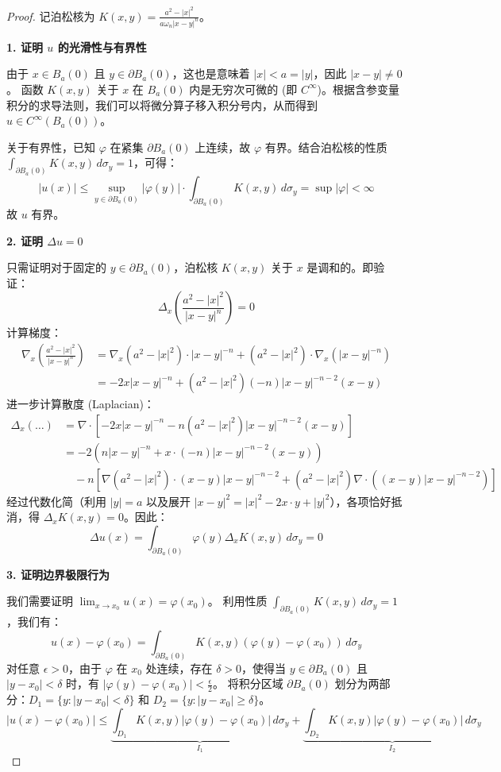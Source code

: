 \documentclass[12pt,a4paper]{ctexart}
\begin{document}
	\begin{proof}
		记泊松核为 $K(x, y) = \frac{a^2 - |x|^2}{a \omega_n |x-y|^n}$。
		
		\textbf{1. 证明 $u$ 的光滑性与有界性}
		
		由于 $x \in B_a(0)$ 且 $y \in \partial B_a(0)$，这也是意味着 $|x| < a = |y|$，因此 $|x-y| \neq 0$。
		函数 $K(x, y)$ 关于 $x$ 在 $B_a(0)$ 内是无穷次可微的 (即 $C^\infty$)。根据含参变量积分的求导法则，我们可以将微分算子移入积分号内，从而得到 $u \in C^\infty(B_a(0))$。
		
		关于有界性，已知 $\varphi$ 在紧集 $\partial B_a(0)$ 上连续，故 $\varphi$ 有界。结合泊松核的性质 $\int_{\partial B_a(0)} K(x, y) \, d\sigma_y = 1$，可得：
		\[
		|u(x)| \le \sup_{y \in \partial B_a(0)} |\varphi(y)| \cdot \int_{\partial B_a(0)} K(x, y) \, d\sigma_y = \sup |\varphi| < \infty
		\]
		故 $u$ 有界。
		
		\vspace{1em}
		
		\textbf{2. 证明 $\Delta u = 0$}
		
		只需证明对于固定的 $y \in \partial B_a(0)$，泊松核 $K(x, y)$ 关于 $x$ 是调和的。即验证：
		\[
		\Delta_x \left( \frac{a^2 - |x|^2}{|x-y|^n} \right) = 0
		\]
		计算梯度：
		\begin{align*}
			\nabla_x \left( \frac{a^2 - |x|^2}{|x-y|^n} \right) &= \nabla_x (a^2 - |x|^2) \cdot |x-y|^{-n} + (a^2 - |x|^2) \cdot \nabla_x (|x-y|^{-n}) \\
			&= -2x |x-y|^{-n} + (a^2 - |x|^2) (-n) |x-y|^{-n-2} (x-y)
		\end{align*}
		进一步计算散度 (Laplacian)：
		\begin{align*}
			\Delta_x (\dots) &= \nabla \cdot \left[ -2x |x-y|^{-n} - n(a^2 - |x|^2)|x-y|^{-n-2}(x-y) \right] \\
			&= -2 \left( n |x-y|^{-n} + x \cdot (-n)|x-y|^{-n-2}(x-y) \right) \\
			&\quad - n \left[ \nabla(a^2-|x|^2) \cdot (x-y)|x-y|^{-n-2} + (a^2-|x|^2) \nabla \cdot ((x-y)|x-y|^{-n-2}) \right]
		\end{align*}
		经过代数化简（利用 $|y|=a$ 以及展开 $|x-y|^2 = |x|^2 - 2x \cdot y + |y|^2$），各项恰好抵消，得 $\Delta_x K(x, y) = 0$。因此：
		\[
		\Delta u(x) = \int_{\partial B_a(0)} \varphi(y) \Delta_x K(x, y) \, d\sigma_y = 0
		\]
		
		\vspace{1em}
		
		\textbf{3. 证明边界极限行为}
		
		我们需要证明 $\lim_{x \to x_0} u(x) = \varphi(x_0)$。
		利用性质 $\int_{\partial B_a(0)} K(x, y) \, d\sigma_y = 1$，我们有：
		\[
		u(x) - \varphi(x_0) = \int_{\partial B_a(0)} K(x, y) (\varphi(y) - \varphi(x_0)) \, d\sigma_y
		\]
		对任意 $\epsilon > 0$，由于 $\varphi$ 在 $x_0$ 处连续，存在 $\delta > 0$，使得当 $y \in \partial B_a(0)$ 且 $|y - x_0| < \delta$ 时，有 $|\varphi(y) - \varphi(x_0)| < \frac{\epsilon}{2}$。
		将积分区域 $\partial B_a(0)$ 划分为两部分：$D_1 = \{y : |y - x_0| < \delta\}$ 和 $D_2 = \{y : |y - x_0| \ge \delta\}$。
		\[
		|u(x) - \varphi(x_0)| \le \underbrace{\int_{D_1} K(x, y) |\varphi(y) - \varphi(x_0)| \, d\sigma_y}_{I_1} + \underbrace{\int_{D_2} K(x, y) |\varphi(y) - \varphi(x_0)| \, d\sigma_y}_{I_2}
		\]
		

\end{proof}
\end{document}
